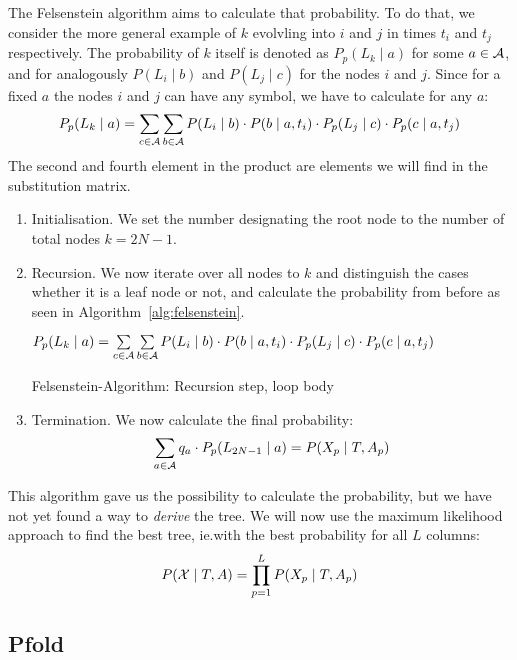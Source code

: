 The Felsenstein algorithm aims to calculate that probability.  To do that, we
consider the more general example of \(k\) evolvling into \(i\) and \(j\) in
times \(t_i\) and \(t_j\) respectively.  The probability of \(k\) itself is
denoted as \(P_p(L_k \mid a)\) for some \(a\in\mathcal{A}\), and for analogously
\(P(L_i \mid b)\) and \(P(L_j \mid c)\) for the nodes \(i\) and \(j\).  Since
for a fixed \(a\) the nodes \(i\) and \(j\) can have any symbol, we have to
calculate for any \(a\):
\[
  P_p(L_k \mid a) = \sum_{c\in\mathcal{A}} \sum_{b\in\mathcal{A}}
      P(L_i \mid b) \cdot P(b \mid a, t_i) \cdot P_p(L_j \mid c) \cdot P_p(c \mid a, t_j)
\]
The second and fourth element in the product are elements we will find in the
substitution matrix.


\begin{enumerate}[label=(\alph*)]
\item Initialisation.  We set the number designating the root node to the number
  of total nodes \(k = 2N-1\).
\item Recursion.  We now iterate over all nodes to \(k\) and distinguish
  the cases whether it is a leaf node or not, and calculate the probability
  from before as seen in Algorithm~\ref{alg:felsenstein}.


\AlgoDisplayBlockMarkers\SetAlgoNoLine%
\begin{algorithm}[ht]
 {
    $P_p(L_k \mid a) = \sum\limits_{c\in\mathcal{A}} \sum\limits_{b\in\mathcal{A}}
        P(L_i \mid b) \cdot P(b \mid a, t_i) \cdot P_p(L_j \mid c) \cdot P_p(c \mid a, t_j)$ \;
} 
\label{alg:felsenstein}
\caption{Felsenstein-Algorithm: Recursion step, loop body}
\end{algorithm}

\item Termination.  We now calculate the final probability:
  \[
    \sum_{a\in\mathcal{A}} q_a \cdot P_p(L_{2N-1} \mid a) = P(X_p \mid T, A_p)
  \]
\end{enumerate}
This algorithm gave us the possibility to calculate the probability, but we
have not yet found a way to \emph{derive} the tree.  We will now use the
maximum likelihood approach to find the best tree, ie.\@ with the best
probability for all \(L\) columns:
\[
  P(\mathcal{X} \mid T,A) = \prod_{p=1}^L P(X_p \mid T,A_p)
\]

\subsection{Pfold}

